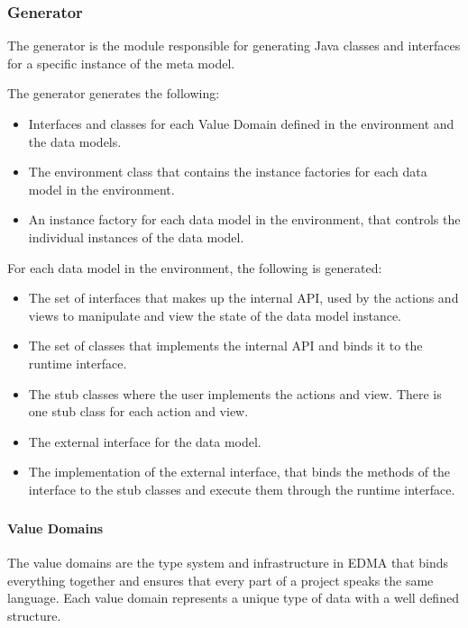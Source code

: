 
\subsubsection{Generator\label{sec:Generator}}

The generator is the module responsible for generating Java classes
and interfaces for a specific instance of the meta model.

The generator generates the following:
\begin{itemize}
\item Interfaces and classes for each Value Domain defined in the environment
and the data models.
\item The environment class that contains the instance factories for each
data model in the environment.
\item An instance factory for each data model in the environment, that controls
the individual instances of the data model.
\end{itemize}
For each data model in the environment, the following is generated:
\begin{itemize}
\item The set of interfaces that makes up the internal API, used by the
actions and views to manipulate and view the state of the data model
instance.
\item The set of classes that implements the internal API and binds it to
the runtime interface.
\item The stub classes where the user implements the actions and view. There
is one stub class for each action and view.
\item The external interface for the data model.
\item The implementation of the external interface, that binds the methods
of the interface to the stub classes and execute them through the
runtime interface.
\end{itemize}

\subparagraph{}


\paragraph{\label{sub:Creation-of-values}Value Domains}

The value domains are the type system and infrastructure in EDMA that
binds everything together and ensures that every part of a project
speaks the same language. Each value domain represents a unique type
of data with a well defined structure.


